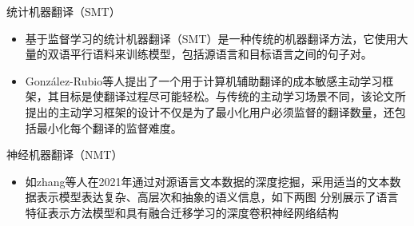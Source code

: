 \documentclass[UTF8]{beamer}
\begin{document}
\begin{frame}{统计机器翻译（SMT）}
    \begin{itemize}
        \item 基于监督学习的统计机器翻译（SMT）是一种传统的机器翻译方法，它使用大量的双语平行语料来训练模型，包括源语言和目标语言之间的句子对。
        \item González-Rubio等人提出了一个用于计算机辅助翻译的成本敏感主动学习框架，其目标是使翻译过程尽可能轻松。与传统的主动学习场景不同，该论文所提出的主动学习框架的设计不仅是为了最小化用户必须监督的翻译数量，还包括最小化每个翻译的监督难度。
    \end{itemize}
\end{frame}

\begin{frame}{神经机器翻译（NMT）}
    \scriptsize
    \begin{itemize}
        \item 如zhang等人在2021年通过对源语言文本数据的深度挖掘，采用适当的文本数据表示模型表达复杂、高层次和抽象的语义信息，如下两图 分别展示了语言特征表示方法模型和具有融合迁移学习的深度卷积神经网络结构
        \begin{figure}[H]
            \centering%
            \quad
        \end{figure}
    \end{itemize}
\end{frame}
\end{document}
